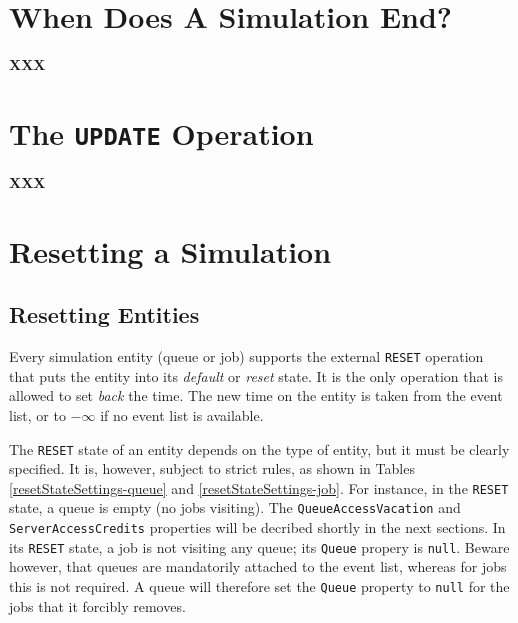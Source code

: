 \documentclass[12pt]{book}
\begin{document}
\section{When Does A Simulation End?}
\label{sec:guided:simulation-end}

{\bf XXX}

\section{The \lstinline|UPDATE| Operation}
\label{sec:guided:update}

{\bf XXX}

\section{Resetting a Simulation}
\label{sec:guided:reset}

\subsection{Resetting Entities}

Every simulation entity (queue or job) supports the
  external \lstinline-RESET- operation
  that puts the entity into its {\em default\/} or
  {\em reset\/} state.
It is the only operation that is allowed to
  set {\em back\/} the time.
The new time on the entity is taken from the event list,
  or to $-\infty$ if no event list is available.

The \lstinline-RESET- state of an entity depends
  on the type of entity,
  but it must be clearly specified.
It is, however, subject to strict rules,
  as shown in Tables
  \ref{resetStateSettings-queue}
  and
  \ref{resetStateSettings-job}.
For instance,
  in the \lstinline|RESET| state,
  a queue is empty (no jobs visiting).
The \lstinline|QueueAccessVacation| and
  \lstinline|ServerAccessCredits|
  properties will be decribed shortly
  in the next sections.
In its \lstinline|RESET| state,
  a job is not visiting any queue;
  its \lstinline|Queue| propery is \lstinline|null|.
Beware however,
  that queues are mandatorily attached to the event list,
  whereas for jobs this is not required.
A queue will therefore set
  the \lstinline|Queue| property to \lstinline|null|
  for the jobs that it forcibly removes.
\end{document}
